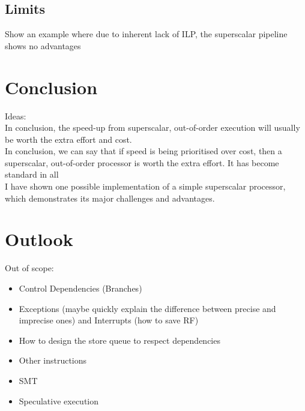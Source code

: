 \documentclass[12pt,a4paper]{article}
\newcommand{\note}{\textcolor{WildStrawberry}}
\begin{document}
\subsection{Limits}
Show an example where due to inherent lack of ILP, the superscalar pipeline shows no advantages

\newpage
\section{Conclusion}
\note{Ideas:}\\

In conclusion, the speed-up from superscalar, out-of-order execution will usually be worth the extra effort and cost.\\
 
In conclusion, we can say that if speed is being prioritised over cost, then a superscalar, out-of-order processor is worth the extra effort. It has become standard in all\\

I have shown one possible implementation of a simple superscalar processor, which demonstrates its major challenges and advantages. 


\newpage
\section{Outlook}
Out of scope:
\begin{itemize}
	\item Control Dependencies (Branches)
	\item Exceptions (maybe quickly explain the difference between precise and imprecise ones) and Interrupts (how to save RF)
	\item How to design the store queue to respect dependencies
	\item Other instructions
	\item SMT
	\item Speculative execution
\end{itemize}
\end{document}
